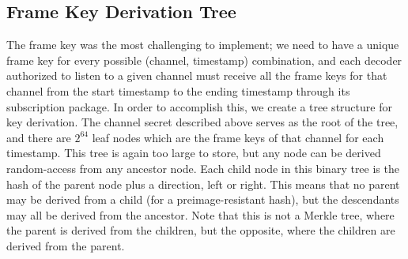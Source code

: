\documentclass[12pt]{article}
\begin{document}
\subsection*{Frame Key Derivation Tree}
The frame key was the most challenging to implement; we need to have a unique frame key for every possible (channel, timestamp) combination, and each decoder authorized to listen to a given channel must receive all the frame keys for that channel from the start timestamp to the ending timestamp through its subscription package.
In order to accomplish this, we create a tree structure for key derivation. The channel secret described above serves as the root of the tree, and there are $2^64$ leaf nodes which are the frame keys of that channel for each timestamp. This tree is again too large to store, but any node can be derived random-access from any ancestor node. Each child node in this binary tree is the hash of the parent node plus a direction, left or right. This means that no parent may be derived from a child (for a preimage-resistant hash), but the descendants may all be derived from the ancestor. Note that this is not a Merkle tree, where the parent is derived from the children, but the opposite, where the children are derived from the parent.\\
\end{document}
